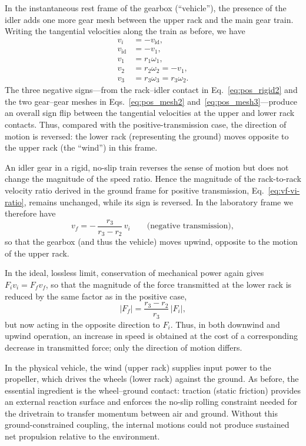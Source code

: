 \documentclass[reprint,aps,pra,longbibliography]{revtex4-2}
\begin{document}
In the instantaneous rest frame of the gearbox (``vehicle''), the presence of
the idler adds one more gear mesh between the upper rack and the main gear
train. Writing the tangential velocities along the train as before, we have
\begin{align}
v_i &= -v_\text{id}, \label{eq:pos_rigid2}\\
v_\text{id} &= -v_1, \label{eq:pos_mesh2}\\
v_1 &= r_1 \omega_1,\\
v_2 &= r_2 \omega_2 = -v_1, \label{eq:pos_mesh3}\\
v_3 &= r_3 \omega_3 = r_3 \omega_2.
\end{align}
The three negative signs---from the rack--idler contact in
Eq.~\eqref{eq:pos_rigid2} and the two gear--gear meshes in
Eqs.~\eqref{eq:pos_mesh2} and~\eqref{eq:pos_mesh3}---produce an overall sign
flip between the tangential velocities at the upper and lower rack contacts.
Thus, compared with the positive-transmission case, the direction of motion is
reversed: the lower rack (representing the ground) moves opposite to the upper
rack (the ``wind'') in this frame.

An idler gear in a rigid, no-slip train reverses the sense of motion but does
not change the magnitude of the speed ratio. Hence the magnitude of the
rack-to-rack velocity ratio derived in the ground frame for positive
transmission, Eq.~\eqref{eq:vf-vi-ratio}, remains unchanged, while its sign is
reversed. In the laboratory frame we therefore have
\begin{equation}
v_f = -\,\frac{r_3}{r_3 - r_2}\,v_i \qquad \text{(negative transmission)},
\end{equation}
so that the gearbox (and thus the vehicle) moves upwind, opposite to the motion
of the upper rack.

In the ideal, lossless limit, conservation of mechanical power again gives
$F_i v_i = F_f v_f$,
so that the magnitude of the force transmitted at the lower rack is reduced by
the same factor as in the positive case,
\begin{equation}
|F_f| = \frac{r_3 - r_2}{r_3} \, |F_i|,
\end{equation}
but now acting in the opposite direction to $F_i$. Thus, in both downwind and
upwind operation, an increase in speed is obtained at the cost of a
corresponding decrease in transmitted force; only the direction of motion
differs.

In the physical vehicle, the wind (upper rack) supplies input power to the
propeller, which drives the wheels (lower rack) against the ground. As before, the essential ingredient is the wheel--ground contact: traction (static friction) provides an external reaction surface and enforces the no-slip rolling constraint needed for the drivetrain to transfer momentum between air and ground. Without this ground-constrained coupling, the internal motions could not produce sustained net propulsion relative to the environment.
\end{document}
